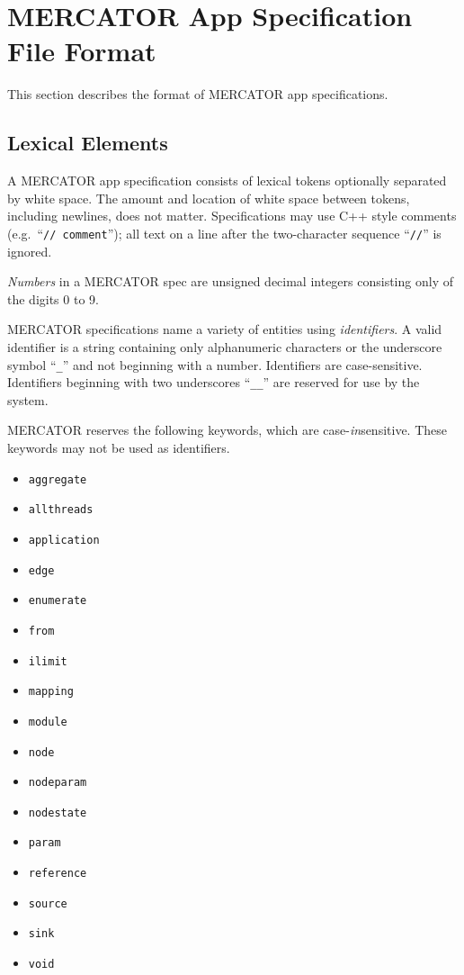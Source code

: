 \documentclass[11pt]{article}
\begin{document}
\section{MERCATOR App Specification File Format}

This section describes the format of MERCATOR app specifications.

\subsection{Lexical Elements}

A MERCATOR app specification consists of lexical tokens optionally
separated by white space. The amount and location of white space between
tokens, including newlines, does not matter.  Specifications may use
C++ style comments (e.g.\ ``\texttt{// comment}''); all text on a line
after the two-character sequence ``\texttt{//}'' is ignored.

\textit{Numbers} in a MERCATOR spec are unsigned decimal integers
consisting only of the digits 0 to 9.

MERCATOR specifications name a variety of entities using
\textit{identifiers}.  A valid identifier is a string containing only
alphanumeric characters or the underscore symbol ``\texttt{_}'' and
not beginning with a number.  Identifiers are case-sensitive.
Identifiers beginning with two underscores ``\texttt{__}'' are
reserved for use by the system.

MERCATOR reserves the following keywords, which are
case-\emph{in}sensitive.  These keywords may not be used as
identifiers.
\begin{multicols}{4}
\begin{itemize}
 \item \texttt{aggregate}
 \item \texttt{allthreads}
 \item \texttt{application}
 \item \texttt{edge}
 \item \texttt{enumerate}
 \item \texttt{from}
 \item \texttt{ilimit}
 \item \texttt{mapping}
 \item \texttt{module}
 \item \texttt{node}
 \item \texttt{nodeparam}
 \item \texttt{nodestate}
 \item \texttt{param}
 \item \texttt{reference}
 \item \texttt{source}
 \item \texttt{sink}
 \item \texttt{void}
\end{itemize}
\end{multicols}
\end{document}
